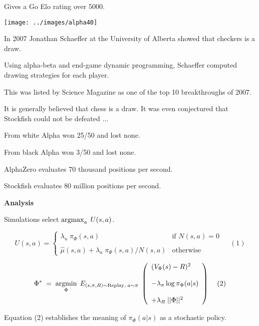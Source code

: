 {\vfill
Gives a Go Elo rating over 5000.


\centerline{\texttt{[image: ../images/alpha40]}}


In 2007 Jonathan Schaeffer at the University of Alberta showed that checkers is a draw.

\vfill
Using alpha-beta and end-game dynamic programming, Schaeffer computed drawing strategies for each player.

\vfill
This was listed by Science Magazine as one of the top 10 breakthroughs of 2007.

\vfill
It is generally believed that chess is a draw.  It was even conjectured that Stockfish could not be defeated ...


From white Alpha won 25/50 and lost none.

\vfill
From black Alpha won 3/50 and lost none.

\vfill
AlphaZero evaluates 70 thousand positions per second.

\vfill
Stockfish evaluates 80 million positions per second.

\slide{}

\centerline{\bf Analysis}

\vfill


Simulations select $\operatorname*{argmax}_a\;U(s,a)$.

{\huge
$$U(s,a) =  \left\{\begin{array}{ll}\lambda_u \; \pi_\Phi(s,a) &\mbox{if $N(s,a) = 0$} \\ \\ \hat{\mu}(s,a) + \lambda_u\; \pi_\Phi(s,a)/N(s,a) & \mbox{otherwise} \end{array}\right. \;\;\;\;(1)$$

\vfill
$$\Phi^*\; = \;\operatorname*{argmin}_\Phi \;E_{(s,\pi,R) \sim \mathrm{Replay},\;a \sim \pi}\;\left(\begin{array}{l} (V_\Phi(s) - R)^2 \\ \\ - \lambda_\pi\log \pi_\Phi(a|s) \\ \\ + \lambda_R\;||\Phi||^2\end{array}\right)\;\;\;\;(2)$$
}
\vfill
Equation (2) establishes the meaning of $\pi_\Phi(a|s)$ as a stochastic policy.

}
